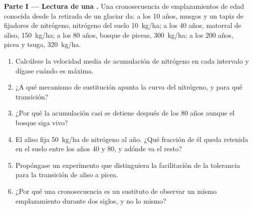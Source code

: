 \begin{problem}
\label{pb:b1:ecosystem-dynamics:1}

\medskip
\noindent\textbf{Parte I --- Lectura de una .}
Una cronosecuencia de emplazamientos de edad conocida desde la retirada de
un glaciar da: a los 10 años, musgos y un tapiz de fijadores de nitrógeno,
nitrógeno del suelo \qty{10}{kg/ha}; a los 40 años, matorral de aliso,
\qty{150}{kg/ha}; a los 80 años, bosque de piceas, \qty{300}{kg/ha}; a los
200 años, picea y tsuga, \qty{320}{kg/ha}.
\begin{enumerate}
  \item Calcúlese la velocidad media de acumulación de nitrógeno en cada
        intervalo y dígase cuándo es máxima.
  \item ¿A qué mecanismo de sustitución apunta la curva del nitrógeno, y
        para qué transición?
  \item ¿Por qué la acumulación casi se detiene después de los 80 años
        aunque el bosque siga vivo?
  \item El aliso fija \qty{50}{kg/ha} de nitrógeno al año. ¿Qué fracción de
        él queda retenida en el suelo entre los años 40 y 80, y adónde va el
        resto?
  \item Propóngase un experimento que distinguiera la facilitación de la
        tolerancia para la transición de aliso a picea.
  \item ¿Por qué una cronosecuencia es un sustituto de observar un mismo
        emplazamiento durante dos siglos, y no lo mismo?
\end{enumerate}


\end{problem}
